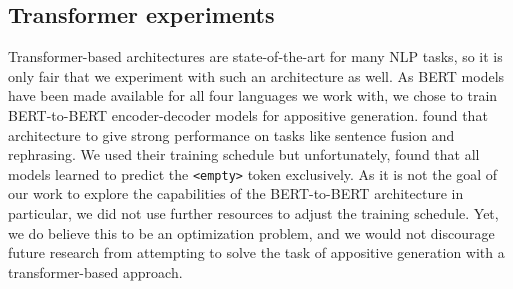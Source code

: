 \documentclass[11pt]{article}
\newcommand{\jttodo}[1]{\todo[color=blue!20]{#1}}
\begin{document}
\subsection{Transformer experiments}
\label{transformer}
Transformer-based architectures are state-of-the-art for many NLP tasks, so it is only fair that we experiment with such an architecture as well. As BERT models \cite{devlin2019bert} have been made available for all four languages we work with, we chose to train BERT-to-BERT encoder-decoder models for appositive generation.  found that architecture to give strong performance on tasks like sentence fusion and rephrasing. We used their training schedule but unfortunately, found that all models learned to predict the \texttt{<empty>} token exclusively. As it is not the goal of our work to explore the capabilities of the BERT-to-BERT architecture in particular, we did not use further resources to adjust the training schedule. Yet, we do believe this to be an optimization problem, and we would not discourage future research from attempting to solve the task of appositive generation with a transformer-based approach.
\end{document}
